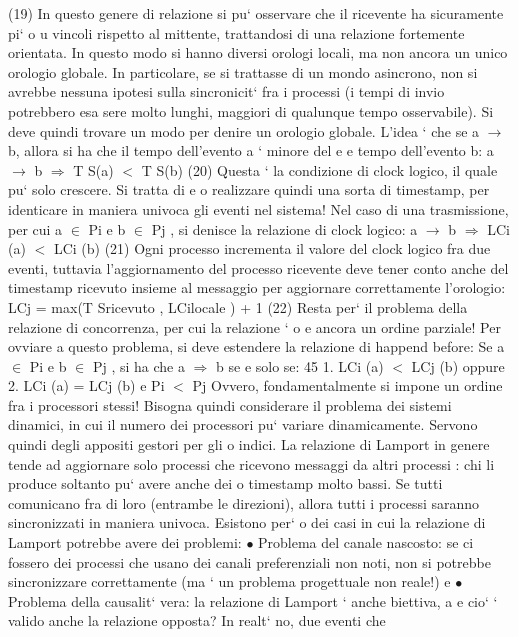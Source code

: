 \documentclass[a4paper,12pt]{article}
\begin{document}
(19)
In questo genere di relazione si pu` osservare che il ricevente ha sicuramente pi`
o
u
vincoli rispetto al mittente, trattandosi di una relazione fortemente orientata.
In questo modo si hanno diversi orologi locali, ma non ancora un unico orologio globale. In particolare, se si trattasse
di un mondo asincrono, non si avrebbe
nessuna ipotesi sulla sincronicit` fra i processi (i tempi di invio potrebbero esa
sere molto lunghi, maggiori di qualunque tempo osservabile). Si deve quindi
trovare un modo per denire un orologio globale.
L'idea ` che se a $\rightarrow$ b, allora si ha che il tempo dell'evento a ` minore del
e
e
tempo dell'evento b:
a $\rightarrow$ b $\Rightarrow$ T S(a) $<$ T S(b)
(20)
Questa ` la condizione di clock logico, il quale pu` solo crescere. Si tratta di
e
o
realizzare quindi una sorta di timestamp, per identicare in maniera univoca gli
eventi nel sistema!
Nel caso di una trasmissione, per cui a $\in$ Pi e b $\in$ Pj , si denisce la relazione
di clock logico:
a $\rightarrow$ b $\Rightarrow$ LCi (a) $<$ LCi (b)
(21)
Ogni processo incrementa il valore del clock logico fra due eventi, tuttavia
l'aggiornamento del processo ricevente deve tener conto anche del timestamp
ricevuto insieme al messaggio per aggiornare correttamente l'orologio:
LCj = max(T Sricevuto , LCilocale ) + 1
(22)
Resta per` il problema della relazione di concorrenza, per cui la relazione `
o
e
ancora un ordine parziale! Per ovviare a questo problema, si deve estendere la
relazione di happend before:
Se a $\in$ Pi e b $\in$ Pj , si ha che a $\Rightarrow$ b se e solo se:
45
1. LCi (a) $<$ LCj (b) oppure
2. LCi (a) = LCj (b) e Pi $<$ Pj
Ovvero, fondamentalmente si impone un ordine fra i processori stessi! Bisogna
quindi considerare il problema dei sistemi dinamici, in cui il numero dei processori pu` variare dinamicamente. Servono
quindi degli appositi gestori per gli
o
indici.
La relazione di Lamport in genere tende ad aggiornare solo processi che
ricevono messaggi da altri processi : chi li produce soltanto pu` avere anche dei
o
timestamp molto bassi. Se tutti comunicano fra di loro (entrambe le direzioni),
allora tutti i processi saranno sincronizzati in maniera univoca. Esistono per`
o
dei casi in cui la relazione di Lamport potrebbe avere dei problemi:
$\bullet$ Problema del canale nascosto: se ci fossero dei processi che usano dei
canali preferenziali non noti, non si potrebbe sincronizzare correttamente
(ma ` un problema progettuale non reale!)
e
$\bullet$ Problema della causalit` vera: la relazione di Lamport ` anche biettiva,
a
e
cio` ` valido anche la relazione opposta? In realt` no, due eventi che
\end{document}
